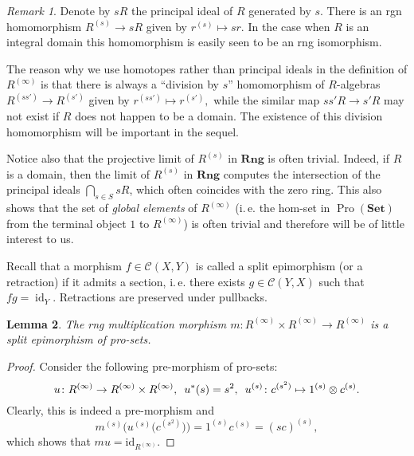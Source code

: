 \documentclass{article}
\newtheorem{lemma}{Lemma} \numberwithin{lemma}{section}
\theoremstyle{definition}
\theoremstyle{remark}
\newtheorem{rem}[lemma]{Remark}
\DeclareMathOperator{\id}{id}
\DeclareMathOperator{\Pro}{Pro}
\newcommand{\Set}{\mathbf{Set}}
\newcommand{\Rng}{\mathbf{Rng}}
\begin{document}
\begin{rem}\label{rem:prorings-comment}
 Denote by $sR$ the principal ideal of $R$ generated by $s$. 
 There is an rgn homomorphism $R^{(s)} \to sR$ given by $r^{(s)}\mapsto sr$.
 In the case when $R$ is an integral domain this homomorphism is easily seen to be an rng isomorphism.
 
 The reason why we use homotopes rather than principal ideals in the definition of $R^{(\infty)}$ is that
 there is always a ``division by $s$'' homomorphism of $R$-algebras $R^{(ss')} \to R^{(s')}$ given by $r^{(ss')} \mapsto r^{(s')},$
 while the similar map $ss'R \to s'R$ may not exist if $R$ does not happen to be a domain.
 The existence of this division homomorphism will be important in the sequel.
 
 Notice also that the projective limit of $R^{(s)}$ in $\Rng$ is often trivial.
 Indeed, if $R$ is a domain, then the limit of $R^{(s)}$ in $\Rng$ computes the intersection of the principal ideals $\bigcap_{s\in S} sR$, which often coincides with the zero ring. 
 This also shows that the set of {\it global elements} of $R^{(\infty)}$ (i.\,e. the hom-set in $\Pro(\Set)$ from the terminal object $1$ to $R^{(\infty)}$) is often trivial and therefore will be of little interest to us.
\end{rem}

Recall that a morphism \(f \in \mathcal C(X, Y)\) is called a split epimorphism (or a retraction) if it admits a section,
 i.\,e. there exists $g \in \mathcal{C}(Y, X)$ such that $fg = \id_{Y}$. Retractions are preserved under pullbacks.

\begin{lemma}\label{RingGeneration}
The rng multiplication morphism $m \colon R^{(\infty)} \times R^{(\infty)} \to R^{(\infty)}$ is a split epimorphism of pro-sets.
\end{lemma}
\begin{proof}
Consider the following pre-morphism of pro-sets:
\[u \colon R^{(\infty)} \to R^{(\infty)} \times R^{(\infty)}, \enskip u^*(s) = s^2, \enskip u^{(s)} \colon c^{(s^2)} \mapsto 1^{(s)} \otimes c^{(s)}.\]
Clearly, this is indeed a pre-morphism and
\[m^{(s)}\bigl(u^{(s)}\bigl(c^{(s^2)}\bigr)\bigr) = 1^{(s)} c^{(s)} = (sc)^{(s)},\]
which shows that $mu = \mathrm{id}_{R^{(\infty)}}$.
\end{proof}
\end{document}
